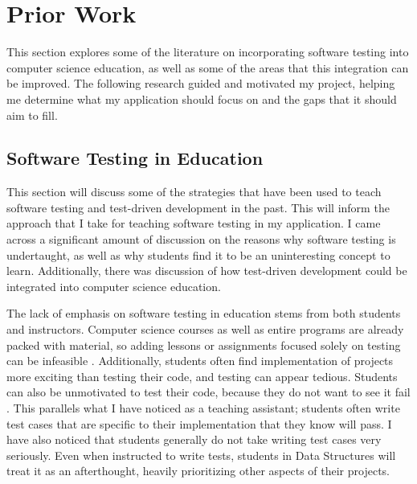 \documentclass[10pt,twocolumn]{article}
\begin{document}
\section{Prior Work}

This section explores some of the literature on incorporating software testing into computer science education, as well 
as some of the areas that this integration can be improved. The following research guided and motivated my project, helping me 
determine what my application should focus on and the gaps that it should aim to fill.



\subsection{Software Testing in Education} 


This section will discuss some of the strategies that have been used to teach software testing and test-driven 
development in the past. This will inform the approach that I take for teaching software testing in my application. 
I came across a significant amount of discussion on the reasons why software testing is undertaught, as well as why 
students find it to be an uninteresting concept to learn. Additionally, there was discussion of how test-driven 
development could be integrated into computer science education. 

The lack of emphasis on software testing in education stems from both students and instructors. Computer science courses 
as well as entire programs are already packed with material, so adding lessons or assignments focused solely on testing 
can be infeasible \cite{Edwards2003Article2}. Additionally, students often find implementation of projects more exciting 
than testing their code, and testing can appear tedious. Students can also be unmotivated to 
test their code, because they do not want to see it fail \cite{Carrington1997Article}. This parallels what I 
have noticed as a teaching assistant; students often write test cases that are specific to their implementation that they 
know will pass. I have also noticed that students generally do not take 
writing test cases very seriously. Even when instructed to write tests, students in Data Structures will treat it as an 
afterthought, heavily prioritizing other aspects of their projects. 
\end{document}
